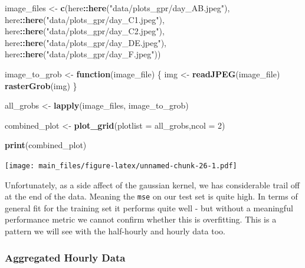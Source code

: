 \documentclass[
]{article}
\newenvironment{Shaded}{\begin{snugshade}}{\end{snugshade}}
\newcommand{\AttributeTok}[1]{\textcolor[rgb]{0.13,0.29,0.53}{#1}}
\newcommand{\ControlFlowTok}[1]{\textcolor[rgb]{0.13,0.29,0.53}{\textbf{#1}}}
\newcommand{\DecValTok}[1]{\textcolor[rgb]{0.00,0.00,0.81}{#1}}
\newcommand{\FunctionTok}[1]{\textcolor[rgb]{0.13,0.29,0.53}{\textbf{#1}}}
\newcommand{\NormalTok}[1]{#1}
\newcommand{\OtherTok}[1]{\textcolor[rgb]{0.56,0.35,0.01}{#1}}
\newcommand{\SpecialCharTok}[1]{\textcolor[rgb]{0.81,0.36,0.00}{\textbf{#1}}}
\newcommand{\StringTok}[1]{\textcolor[rgb]{0.31,0.60,0.02}{#1}}
\begin{document}
\begin{Shaded}
\begin{Highlighting}[]
\NormalTok{image\_files }\OtherTok{\textless{}{-}} \FunctionTok{c}\NormalTok{(here}\SpecialCharTok{::}\FunctionTok{here}\NormalTok{(}\StringTok{"data/plots\_gpr/day\_AB.jpeg"}\NormalTok{),}
\NormalTok{                  here}\SpecialCharTok{::}\FunctionTok{here}\NormalTok{(}\StringTok{"data/plots\_gpr/day\_C1.jpeg"}\NormalTok{),}
\NormalTok{                  here}\SpecialCharTok{::}\FunctionTok{here}\NormalTok{(}\StringTok{"data/plots\_gpr/day\_C2.jpeg"}\NormalTok{),}
\NormalTok{                  here}\SpecialCharTok{::}\FunctionTok{here}\NormalTok{(}\StringTok{"data/plots\_gpr/day\_DE.jpeg"}\NormalTok{),}
\NormalTok{                  here}\SpecialCharTok{::}\FunctionTok{here}\NormalTok{(}\StringTok{"data/plots\_gpr/day\_F.jpeg"}\NormalTok{))}

\NormalTok{image\_to\_grob }\OtherTok{\textless{}{-}} \ControlFlowTok{function}\NormalTok{(image\_file) \{}
\NormalTok{  img }\OtherTok{\textless{}{-}} \FunctionTok{readJPEG}\NormalTok{(image\_file)}
  \FunctionTok{rasterGrob}\NormalTok{(img)}
\NormalTok{\}}


\NormalTok{all\_grobs }\OtherTok{\textless{}{-}} \FunctionTok{lapply}\NormalTok{(image\_files, image\_to\_grob)}

\NormalTok{combined\_plot }\OtherTok{\textless{}{-}} \FunctionTok{plot\_grid}\NormalTok{(}\AttributeTok{plotlist =}\NormalTok{ all\_grobs,}\AttributeTok{ncol =} \DecValTok{2}\NormalTok{)}


\FunctionTok{print}\NormalTok{(combined\_plot)}
\end{Highlighting}
\end{Shaded}

\texttt{[image: main\_files/figure-latex/unnamed-chunk-26-1.pdf]}

Unfortunately, as a side affect of the gaussian kernel, we has
considerable trail off at the end of the data. Meaning the \texttt{mse}
on our test set is quite high. In terms of general fit for the training
set it performs quite well - but without a meaningful performance metric
we cannot confirm whether this is overfitting. This is a pattern we will
see with the half-hourly and hourly data too.

\hypertarget{aggregated-hourly-data}{%
\subsubsection{Aggregated Hourly Data}\label{aggregated-hourly-data}}
\end{document}
